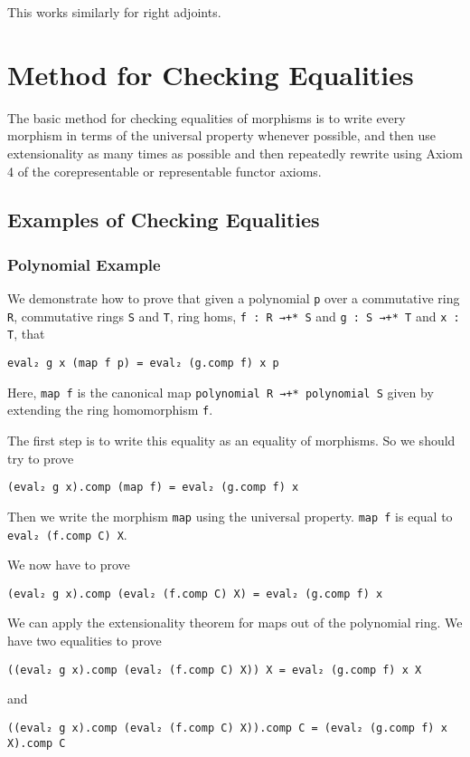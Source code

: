 \documentclass[12pt]{article} %
\theoremstyle{definition}
\theoremstyle{definition}
\theoremstyle{definition}
\theoremstyle{definition}
\begin{document}
This works similarly for right adjoints.

\section{Method for Checking Equalities}

The basic method for checking equalities of morphisms is to write every morphism in terms of 
the universal property whenever possible, and then use extensionality as many times
as possible and then repeatedly 
rewrite using Axiom 4 of the corepresentable or representable functor axioms.

\subsection{Examples of Checking Equalities}

\subsubsection{Polynomial Example}
We demonstrate how to prove that given a polynomial
\lstinline{p} over a commutative ring \lstinline{R}, commutative rings
\lstinline{S} and \lstinline{T}, ring homs,
\lstinline{f : R →+* S} and \lstinline{g : S →+* T} and \lstinline{x : T},
that 
\begin{lstlisting}
eval₂ g x (map f p) = eval₂ (g.comp f) x p
\end{lstlisting}

Here, \lstinline{map f} is the canonical map \lstinline{polynomial R →+* polynomial S}
given by extending the ring homomorphism \lstinline{f}.

The first step is to write this equality as an equality of morphisms. So we should try to prove
\begin{lstlisting}
(eval₂ g x).comp (map f) = eval₂ (g.comp f) x
\end{lstlisting}

Then we write the morphism \lstinline{map} using the universal property. 
\lstinline{map f} is equal to \lstinline {eval₂ (f.comp C) X}.

We now have to prove
\begin{lstlisting}
(eval₂ g x).comp (eval₂ (f.comp C) X) = eval₂ (g.comp f) x
\end{lstlisting}

We can apply the extensionality theorem for maps out of the polynomial ring.
We have two equalities to prove
\begin{lstlisting}
((eval₂ g x).comp (eval₂ (f.comp C) X)) X = eval₂ (g.comp f) x X
\end{lstlisting}
and 
\begin{lstlisting}
((eval₂ g x).comp (eval₂ (f.comp C) X)).comp C = (eval₂ (g.comp f) x X).comp C
\end{lstlisting}
\end{document}
